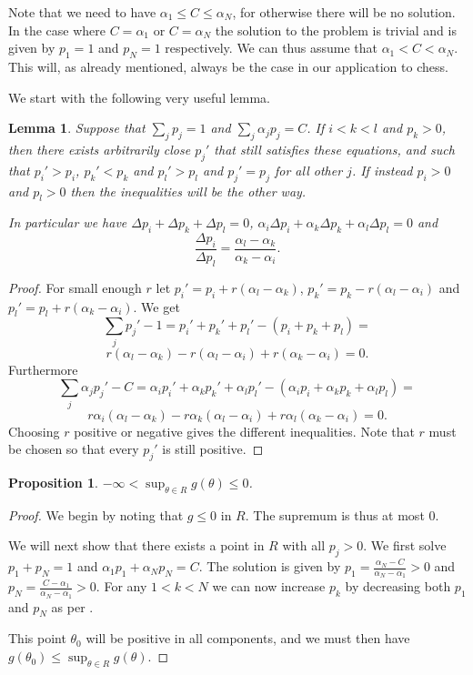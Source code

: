 \documentclass{article}
\theoremstyle{plain}
\newtheorem{proposition} {\bf Proposition} [section]
\newtheorem{lemma}       {\bf Lemma}       [section]
\theoremstyle{definition}
\begin{document}
Note that we need to have $\alpha_1\leq C\leq\alpha_N$, for otherwise there will be no solution.
In the case where $C=\alpha_1$ or $C=\alpha_N$ the solution to the problem is trivial and is given
by $p_1=1$ and $p_N=1$ respectively. We can thus assume that $\alpha_1<C<\alpha_N$. This will,
as already mentioned, always be the case in our application to chess.

We start with the following very useful lemma.

\begin{lemma}\label{increase}
	Suppose that $\sum_jp_j=1$ and $\sum_j\alpha_jp_j=C$. If $i<k<l$ and $p_k>0$,
	then there exists arbitrarily close $p_j'$ that still satisfies these equations,
	and such that $p_i'>p_i$, $p_k'<p_k$ and $p_l'>p_l$ and $p_j'=p_j$ for all other $j$.
	If instead $p_i>0$ and $p_l>0$ then the inequalities will be the other way.

	In particular we have $\Delta p_i+\Delta p_k+\Delta p_l=0$,
	$\alpha_i\Delta p_i+\alpha_k\Delta p_k+\alpha_l\Delta p_l=0$ and
	$$\frac{\Delta p_i}{\Delta p_l}=\frac{\alpha_l-\alpha_k}{\alpha_k-\alpha_i}.$$
\end{lemma}
\begin{proof}
	For small enough $r$ let $p_i'=p_i+r(\alpha_l-\alpha_k)$, $p_k'=p_k-r(\alpha_l
	-\alpha_i)$ and $p_l'=p_l+r(\alpha_k-\alpha_i)$. We get
	$$\sum_jp_j'-1=p_i'+p_k'+p_l'-(p_i+p_k+p_l)=$$
	$$r(\alpha_l-\alpha_k)-r(\alpha_l-\alpha_i)
	+r(\alpha_k-\alpha_i)=0.$$
	Furthermore
	$$\sum_j\alpha_jp_j'-C=\alpha_ip_i'+\alpha_kp_k'+\alpha_lp_l'-(\alpha_ip_i+
	\alpha_kp_k+\alpha_lp_l)=$$
	$$r\alpha_i(\alpha_l-\alpha_k)-r\alpha_k(\alpha_l-\alpha_i)+
	r\alpha_l(\alpha_k-\alpha_i)=0.$$
	Choosing $r$ positive or negative gives the different inequalities. Note that
	$r$ must be chosen so that every $p_j'$ is still positive.
\end{proof}

\begin{proposition}\label{supremum}
	$-\infty<\sup_{\theta\in R}g(\theta)\leq 0$.
\end{proposition}
\begin{proof}
	We begin by noting that $g\leq 0$ in $R$. The supremum is thus at most $0$.

	We will next show that there exists a point in $R$ with all $p_j>0$. We first
	solve $p_1+p_N=1$ and $\alpha_1p_1+\alpha_Np_N=C$. The solution is given by
	$p_1=\frac{\alpha_N-C}{\alpha_N-\alpha_1}>0$ and $p_N=\frac{C-\alpha_1}
	{\alpha_N-\alpha_1}>0$. For any $1<k<N$ we can now increase $p_k$ by decreasing
	both $p_1$ and $p_N$ as per .
	
	This point $\theta_0$ will be
	positive in all components, and we must then have
	$g(\theta_0)\leq\sup_{\theta\in R}g(\theta)$.

\end{proof}
\end{document}
